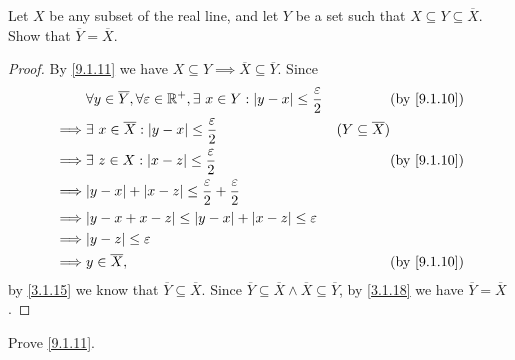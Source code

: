 \exercisesection

\begin{ex}\label{ex:9.1.1}
  Let \(X\) be any subset of the real line, and let \(Y\) be a set such that \(X \subseteq Y \subseteq \overline{X}\).
  Show that \(\overline{Y} = \overline{X}\).
\end{ex}

\begin{proof}
  By \cref{9.1.11} we have \(X \subseteq Y \implies \overline{X} \subseteq \overline{Y}\).
  Since
  \begin{align*}
             & \forall y \in \overline{Y}, \forall \varepsilon \in \R^+, \exists\ x \in Y : \abs{y - x} \leq \dfrac{\varepsilon}{2} &                            & \text{(by \cref{9.1.10})} \\
    \implies & \exists\ x \in \overline{X} : \abs{y - x} \leq \dfrac{\varepsilon}{2}                                                & (Y \subseteq \overline{X})                             \\
    \implies & \exists\ z \in X : \abs{x - z} \leq \dfrac{\varepsilon}{2}                                                           &                            & \text{(by \cref{9.1.10})} \\
    \implies & \abs{y - x} + \abs{x - z} \leq \dfrac{\varepsilon}{2} + \dfrac{\varepsilon}{2}                                                                                                \\
    \implies & \abs{y - x + x - z} \leq \abs{y - x} + \abs{x - z} \leq \varepsilon                                                                                                           \\
    \implies & \abs{y - z} \leq \varepsilon                                                                                                                                                  \\
    \implies & y \in \overline{X},                                                                                                  &                            & \text{(by \cref{9.1.10})}
  \end{align*}
  by \cref{3.1.15} we know that \(\overline{Y} \subseteq \overline{X}\).
  Since \(\overline{Y} \subseteq \overline{X} \land \overline{X} \subseteq \overline{Y}\), by \cref{3.1.18} we have \(\overline{Y} = \overline{X}\).
\end{proof}

\begin{ex}\label{ex:9.1.2}
  Prove \cref{9.1.11}.
\end{ex}

